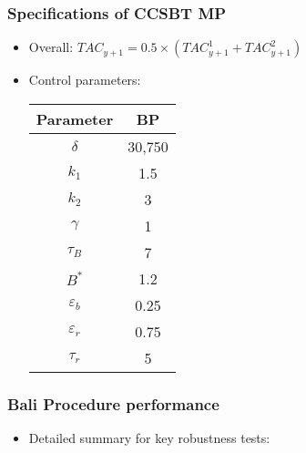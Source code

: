 \documentclass{beamer}
\newcommand{\veps}{\varepsilon}
\begin{document}
\begin{frame}
    \frametitle{Specifications of CCSBT MP}
\begin{itemize}
    \item Overall: $TAC_{y+1}=0.5\times\left(TAC^1_{y+1}+TAC^2_{y+1}\right)$ 
    \item Control parameters:
\begin{table}[ht]
\begin{center}
\begin{tabular}{|cc|}
\hline
Parameter & BP\\
\hline\hline
$\delta$ & 30,750\\
$k_1$ & 1.5\\
$k_2$ & 3\\
$\gamma$ & 1\\
$\tau_B$ & 7\\
$B^*$ & 1.2\\
$\veps_b$ & 0.25\\
$\veps_r$ & 0.75\\
$\tau_r$ & 5\\
\hline
\end{tabular}
\end{center}
\end{table}
\end{itemize}
\end{frame}
\begin{frame}
    \frametitle{Bali Procedure performance}
\begin{itemize}
    \item Detailed summary for key robustness tests:
\begin{figure}
\begin{center}
\hspace{-1cm}
\end{center}
\end{figure}
\end{itemize}
\end{frame}
\end{document}
